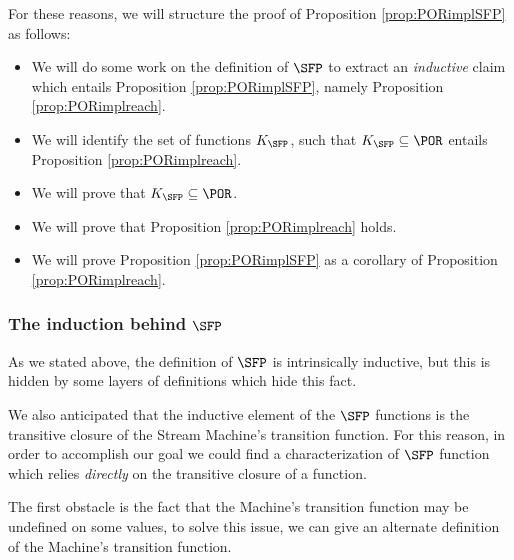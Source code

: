 \begin{conditional}{\notappendix}
  For these reasons, we will structure the proof of Proposition \ref{prop:PORimplSFP}
  as follows:

  \begin{itemize}
    \item We will do some work on the definition of $\SFP$ to extract an \emph{inductive}
    claim which entails Proposition \ref{prop:PORimplSFP}, namely Proposition
    \ref{prop:PORimplreach}.
    \item We will identify the set of functions $K_\SFP$, such that
    $K_\SFP \subseteq \POR$ entails Proposition \ref{prop:PORimplreach}.
    \item We will prove that $K_\SFP \subseteq \POR$.
    \item We will prove that Proposition \ref{prop:PORimplreach} holds.
    \item We will prove Proposition \ref{prop:PORimplSFP} as a corollary of Proposition \ref{prop:PORimplreach}.
  \end{itemize}

  \subsubsection{The induction behind $\SFP$}
  \label{subsub:iductivesfp}

  As we stated above, the definition of $\SFP$ is intrinsically inductive, but
  this is hidden by some layers of definitions which hide this fact.

  We also anticipated that the inductive element of the $\SFP$ functions is the
  transitive closure of the Stream Machine's transition function. For this reason,
  in order to accomplish our goal we could find a characterization of $\SFP$
  function which relies \emph{directly} on the transitive closure of a function.

  The first obstacle is the fact that the Machine's transition function may be
  undefined on some values, to solve this issue, we can give an alternate definition
  of the Machine's transition function.


\end{conditional}
